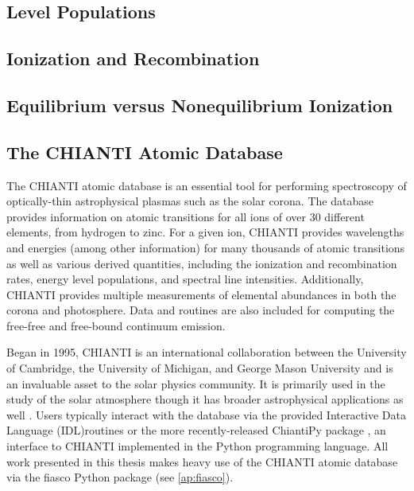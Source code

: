 
\subsection{Level Populations}\label{subsec:level_pops}


\subsection{Ionization and Recombination}\label{subsec:ionization_recombination}

\subsection{Equilibrium versus Nonequilibrium Ionization}\label{subsec:ioneq_versus_nei}

\subsection{The CHIANTI Atomic Database}\label{subsec:chianti}

The CHIANTI atomic database \citep{dere_chianti_1997,young_chianti_1998,landi_chianti_1999,dere_chianti-atomic_2001,landi_chianti-atomic_2002,young_chianti-atomic_2003,landi_chianti-atomic_2006,landi_chianti-atomic_2006-1,dere_chianti_2009,landi_chiantiatomic_2009,young_chiantiatomic_2009,landi_chiantiatomic_2012,landi_chiantiatomic_2013,del_zanna_chianti_2015,young_chianti_2016} is an essential tool for performing spectroscopy of optically-thin astrophysical plasmas such as the solar corona. The database provides information on atomic transitions for all ions of over 30 different elements, from hydrogen to zinc. For a given ion, CHIANTI provides wavelengths and energies (among other information) for many thousands of atomic transitions as well as various derived quantities, including the ionization and recombination rates, energy level populations, and spectral line intensities. Additionally, CHIANTI provides multiple measurements of elemental abundances in both the corona and photosphere. Data and routines are also included for computing the free-free and free-bound continuum emission. 

Began in 1995, CHIANTI is an international collaboration between the University of Cambridge, the University of Michigan, and George Mason University and is an invaluable asset to the solar physics community. It is primarily used in the study of the solar atmosphere though it has broader astrophysical applications as well \citep[see Figure 4 of][]{young_chianti_2016}. Users typically interact with the database via the provided Interactive Data Language (IDL)routines or the more recently-released ChiantiPy package \citep{landi_chiantiatomic_2012,barnes_chiantipy_2017}, an interface to CHIANTI implemented in the Python programming language. All work presented in this thesis makes heavy use of the CHIANTI atomic database via the fiasco Python package (see \autoref{ap:fiasco}).

